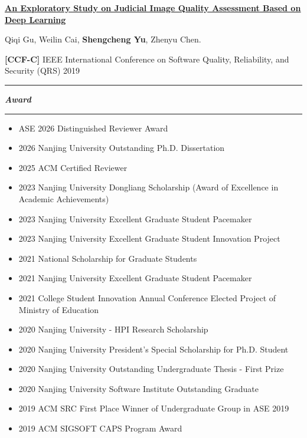 \documentclass[12pt,a4paper]{article}
\newcommand{\cvsection}[1]{%
  \par\vspace{5pt}%
  \noindent\begin{minipage}{\linewidth}%
    \rule{\linewidth}{1.3pt}\par%
    \parbox[c][31pt][c]{\linewidth}{%
      \fontsize{20}{22}\selectfont\bfseries\itshape #1%
    }\par%
    \rule{\linewidth}{1.3pt}%
  \end{minipage}\par\nobreak\vspace{4pt}\nobreak%
}
\newcommand{\me}{\textbf{Shengcheng Yu}}
\newcommand{\ccf}[1]{\textbf{[#1]}}
\newcommand{\publication}[5]{%
  \begin{samepage}%
  \href{#5}{\textbf{\uline{#1}}}#2\par\nopagebreak[4]
  #3.\par\nopagebreak[4]
  #4\par
  \end{samepage}%
  \vspace{4.8pt}%
}
\begin{document}
\publication
{An Exploratory Study on Judicial Image Quality Assessment Based on Deep Learning}
{}
{Qiqi Gu, Weilin Cai, \me, Zhenyu Chen}
{\ccf{CCF-C} IEEE International Conference on Software Quality, Reliability, and Security (QRS) 2019}
{https://doi.org/10.1109/QRS.2019.00046}

\endgroup

\cvsection{Award}
\begin{itemize}[leftmargin=1.25em,label=\textbullet,topsep=0pt,itemsep=0pt,parsep=0pt]
  \item ASE 2026 Distinguished Reviewer Award
  \item 2026 Nanjing University Outstanding Ph.D. Dissertation
  \item 2025 ACM Certified Reviewer
  \item 2023 Nanjing University Dongliang Scholarship (Award of Excellence in Academic Achievements)
  \item 2023 Nanjing University Excellent Graduate Student Pacemaker
  \item 2023 Nanjing University Excellent Graduate Student Innovation Project
  \item 2021 National Scholarship for Graduate Students
  \item 2021 Nanjing University Excellent Graduate Student Pacemaker
  \item 2021 College Student Innovation Annual Conference Elected Project of Ministry of Education
  \item 2020 Nanjing University - HPI Research Scholarship
  \item 2020 Nanjing University President's Special Scholarship for Ph.D. Student
  \item 2020 Nanjing University Outstanding Undergraduate Thesis - First Prize
  \item 2020 Nanjing University Software Institute Outstanding Graduate
  \item 2019 ACM SRC First Place Winner of Undergraduate Group in ASE 2019
  \item 2019 ACM SIGSOFT CAPS Program Award
\end{itemize}
\end{document}
